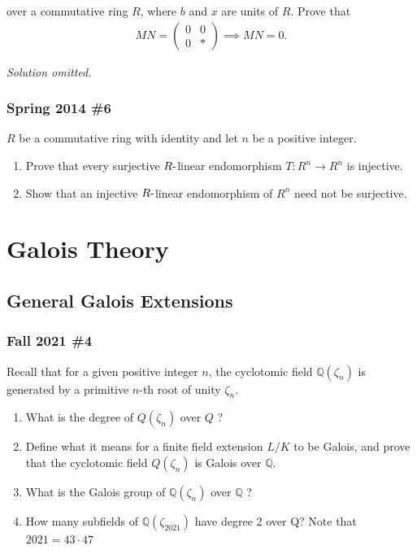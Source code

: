 over a commutative ring \(R\), where \(b\) and \(x\) are units of \(R\).
Prove that
\begin{align*}
M N=\left(\begin{array}{ll}{0} & {0} \\ {0} & {*}\end{array}\right)
\implies MN = 0
.\end{align*}

\emph{Solution omitted.}

\hypertarget{spring-2014-6}{%
\subsubsection{Spring 2014 \#6}\label{spring-2014-6}}

\(R\) be a commutative ring with identity and let \(n\) be a positive
integer.

\begin{enumerate}
\def\labelenumi{\alph{enumi}.}
\item
  Prove that every surjective \(R{\hbox{-}}\)linear endomorphism
  \(T: R^n \to R^n\) is injective.
\item
  Show that an injective \(R{\hbox{-}}\)linear endomorphism of \(R^n\)
  need not be surjective.
\end{enumerate}

\hypertarget{galois-theory}{%
\section{Galois Theory}\label{galois-theory}}

\hypertarget{general-galois-extensions}{%
\subsection{General Galois Extensions}\label{general-galois-extensions}}

\hypertarget{fall-2021-4}{%
\subsubsection{Fall 2021 \#4}\label{fall-2021-4}}

Recall that for a given positive integer \(n\), the cyclotomic field
\(\mathbb{Q}\left(\zeta_{n}\right)\) is generated by a primitive
\(n\)-th root of unity \(\zeta_{n}\).

\begin{enumerate}
\def\labelenumi{\alph{enumi}.}
\item
  What is the degree of \(Q\left(\zeta_{n}\right)\) over \(Q\) ?
\item
  Define what it means for a finite field extension \(L / K\) to be
  Galois, and prove that the cyclotomic field
  \(Q\left(\zeta_{n}\right)\) is Galois over \(\mathbb{Q}\).
\item
  What is the Galois group of \(\mathbb{Q}\left(\zeta_{n}\right)\) over
  \(\mathbb{Q}\) ?
\item
  How many subfields of \(\mathbb{Q}\left(\zeta_{2021}\right)\) have
  degree 2 over Q? Note that \(2021=43 \cdot 47\)
\end{enumerate}

